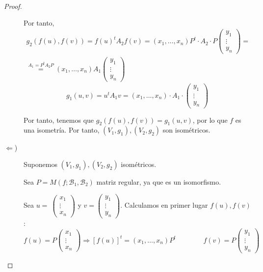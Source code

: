 \begin{proof}
\begin{description}
    Por tanto,
    \begin{multline*}
        g_2(f(u), f(v)) = f(u)^t A_2 f(v) =
        (x_1, \dots, x_n)P^t \cdot A_2 \cdot P\left(\begin{array}{c}
            y_1 \\ \vdots \\ y_n
        \end{array}\right)
        =\\\stackrel{A_1=P^tA_2P}{=}
        (x_1, \dots, x_n)A_1\left(\begin{array}{c}
            y_1 \\ \vdots \\ y_n
        \end{array}\right)
    \end{multline*}
    \begin{equation*}
        g_1(u,v) = u^t A_1 v =
        (x_1, \dots, x_n) \cdot A_1 \cdot \left(\begin{array}{c}
            y_1 \\ \vdots \\ y_n
        \end{array}\right)
    \end{equation*}

    Por tanto, tenemos que $g_2(f(u), f(v)) = g_1(u,v)$, por lo que $f$ es una isometría. Por tanto, $(V_1,g_1),(V_2,g_2)$ son isométricos.

    
    \item [$\Longleftarrow$)]
    Suponemos $(V_1,g_1),(V_2,g_2)$ isométricos.
    
    Sea $P=M(f;\mathcal{B}_1, \mathcal{B}_2)$ matriz regular, ya que es un isomorfismo.
    
    Sea $u=~\left(\begin{array}{c}
        x_1 \\ \vdots \\ x_n
    \end{array}\right)$ y $v=\left(\begin{array}{c}
        y_1 \\ \vdots \\ y_n
    \end{array}\right)$. Calculamos en primer lugar $f(u), f(v)$:
    \begin{equation*}
        f(u)=P\left(\begin{array}{c}
            x_1 \\ \vdots \\ x_n
        \end{array}\right) \Longrightarrow [f(u)]^t =  (x_1, \dots, x_n) P^t
        \qquad \qquad
        f(v)=P\left(\begin{array}{c}
            y_1 \\ \vdots \\ y_n
        \end{array}\right)        
    \end{equation*}


\end{description}
\end{proof}
